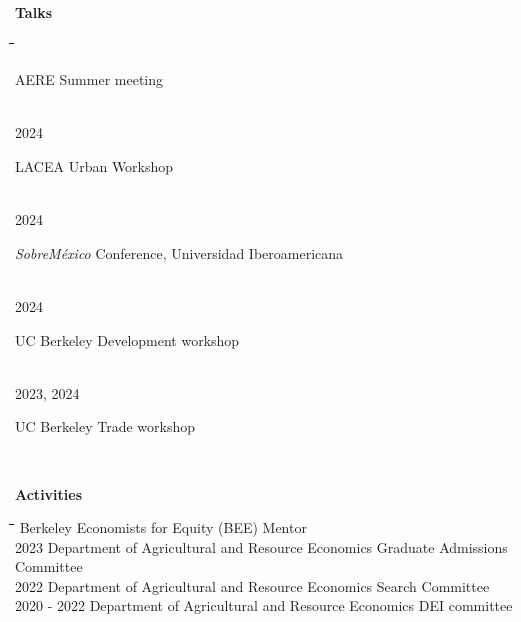 \documentclass[10pt, oneside]{article}
\makeatletter
\newlength\tdima
\newcommand\tabfill[1]{%
      \setlength\tdima{\linewidth}%
      \addtolength\tdima{\@totalleftmargin}%
      \addtolength\tdima{-\dimen\@curtab}%
      \parbox[t]{\tdima}{#1\ifhmode\strut\fi}}
\newcommand\mytabs{\hspace*{1cm}\=\hspace{1cm}\=\hspace{1cm}\=\hspace{1cm}\=\hspace{1cm}\=\hspace{1cm}\=\hspace{1cm}\=\hspace{1cm}\=\hspace{1cm}\=\hspace{1cm}}
\newenvironment{mysec}[1][\mytabs]
  {\begin{tabbing}#1\kill\ignorespaces}
  {\end{tabbing}}
\makeatother
\begin{document}
\begin{minipage}[t]{0.1\linewidth}
\textbf{Talks}
\end{minipage}\hspace{0.05\linewidth}
\begin{minipage}[t]{0.8\linewidth}
\begin{mysec} 
    2025 \>\> \tabfill{AERE Summer meeting} \\
	2024 \>\> \tabfill{LACEA Urban Workshop} \\
    2024 \>\> \tabfill{\textit{SobreMéxico} Conference,  Universidad Iberoamericana}\\ 
    2024 \>\> \tabfill{UC Berkeley Development workshop} \\
    2023, 2024 \>\> \tabfill{UC Berkeley Trade workshop} \\
\end{mysec} 
\end{minipage}\vspace{5mm}


\begin{minipage}[t]{0.1\linewidth}
\textbf{Activities}
\end{minipage}\hspace{0.05\linewidth}
\begin{minipage}[t]{0.8\linewidth}
\begin{mysec}
    2024 \>\> Berkeley Economists for Equity (BEE) Mentor\\ 
    2023 \>\> Department of Agricultural and Resource Economics Graduate Admissions Committee \\
    2022 \>\> Department of Agricultural and Resource Economics Search Committee \\
    2020 - 2022 \>\> Department of Agricultural and Resource Economics DEI committee \\


\end{mysec}
\end{minipage}\vspace{5mm}
\end{document}
